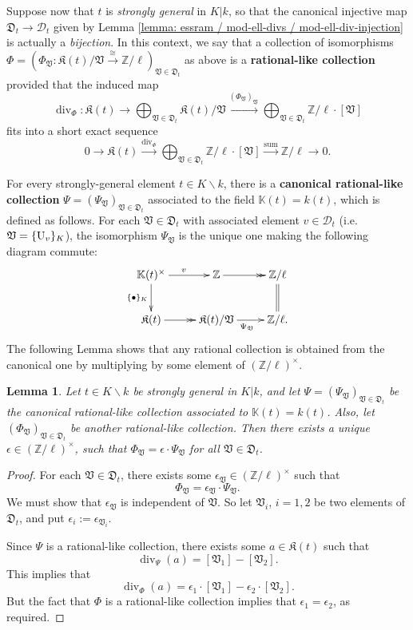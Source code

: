 \documentclass[11pt]{amsart}
\newtheorem{lemma}[proposition]{Lemma}
\theoremstyle{definition}
\theoremstyle{remark}
\numberwithin{equation}{section}
\DeclareMathOperator{\divv}{div}
\newcommand{\Z}{\mathbb{Z}}
\newcommand{\U}{{\rm U}}
\newcommand{\Kbb}{\mathbb{K}}
\newcommand{\Dcal}{\mathscr{D}}
\newcommand{\Kfrak}{\mathfrak{K}}
\newcommand{\Dfrak}{\mathfrak{D}}
\newcommand{\Vfrak}{\mathfrak{V}}
\begin{document}
Suppose now that $t$ is \emph{strongly general} in $K|k$, so that the canonical injective map $\Dfrak_t \rightarrow \Dcal_t$ given by Lemma \ref{lemma: essram / mod-ell-divs / mod-ell-div-injection} is actually a \emph{bijection}.
In this context, we say that a collection of isomorphisms $\Phi = (\Phi_\Vfrak : \Kfrak(t)/\Vfrak \xrightarrow{\cong} \Z/\ell)_{\Vfrak \in \Dfrak_t}$ as above is a {\bf rational-like collection} provided that the induced map
\[ \divv_\Phi : \Kfrak(t) \rightarrow \bigoplus_{\Vfrak \in \Dfrak_t} \Kfrak(t)/\Vfrak \xrightarrow{(\Phi_\Vfrak)_{\Vfrak}} \bigoplus_{\Vfrak \in \Dfrak_t} \Z/\ell \cdot [\Vfrak] \]
fits into a short exact sequence
\[ 0 \rightarrow \Kfrak(t) \xrightarrow{\divv_\Phi} \bigoplus_{\Vfrak \in \Dfrak_t} \Z/\ell \cdot [\Vfrak] \xrightarrow{\text{sum}} \Z/\ell \rightarrow 0. \]

For every strongly-general element $t \in K \smallsetminus k$, there is a {\bf canonical rational-like collection} $\Psi = (\Psi_\Vfrak)_{\Vfrak \in \Dfrak_t}$ associated to the field $\Kbb(t) = k(t)$, which is defined as follows.
For each $\Vfrak \in \Dfrak_t$ with associated element $v \in \Dcal_t$ (i.e. $\Vfrak = \{\U_v\}_K$), the isomorphism $\Psi_\Vfrak$ is the unique one making the following diagram commute:
\[
\xymatrix{
  \Kbb(t)^\times \ar[r]^{v}\ar[d]_{\{\bullet\}_K} & \Z \ar@{->>}[r] & \Z/\ell \ar@{=}[d] \\
  \Kfrak(t) \ar@{->>}[r] & \Kfrak(t)/\Vfrak \ar[r]_{\Psi_\Vfrak} & \Z/\ell.
}
\]
The following Lemma shows that any rational collection is obtained from the canonical one by multiplying by some element of $(\Z/\ell)^\times$.

\begin{lemma}
\label{lemma: strgen / rational-like / rational-like}
  Let $t \in K \smallsetminus k$ be strongly general in $K|k$, and let $\Psi = (\Psi_\Vfrak)_{\Vfrak \in \Dfrak_t}$ be the canonical rational-like collection associated to $\Kbb(t) = k(t)$.
  Also, let $(\Phi_\Vfrak)_{\Vfrak \in \Dfrak_t}$ be another rational-like collection.
  Then there exists a unique $\epsilon \in (\Z/\ell)^\times$, such that $\Phi_\Vfrak = \epsilon \cdot \Psi_\Vfrak$ for all $\Vfrak \in \Dfrak_t$.
\end{lemma}
\begin{proof}
  For each $\Vfrak \in \Dfrak_t$, there exists some $\epsilon_\Vfrak \in (\Z/\ell)^\times$ such that
  \[ \Phi_\Vfrak = \epsilon_\Vfrak \cdot \Psi_\Vfrak. \]
  We must show that $\epsilon_\Vfrak$ is independent of $\Vfrak$.
  So let $\Vfrak_i$, $i = 1,2$ be two elements of $\Dfrak_t$, and put $\epsilon_i := \epsilon_{\Vfrak_i}$.

  Since $\Psi$ is a rational-like collection, there exists some $a \in \Kfrak(t)$ such that
  \[ \divv_\Psi(a) = [\Vfrak_1]-[\Vfrak_2]. \]
  This implies that
  \[ \divv_\Phi(a) = \epsilon_1 \cdot [\Vfrak_1] - \epsilon_2 \cdot [\Vfrak_2]. \]
  But the fact that $\Phi$ is a rational-like collection implies that $\epsilon_1 = \epsilon_2$, as required.
\end{proof}
\end{document}
